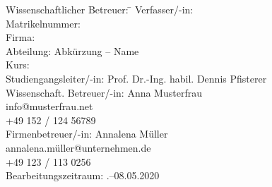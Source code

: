 \begin{titlepage}
\begin{center}
\begin{minipage}{\textwidth}
\begin{tabbing}
	Wissenschaftlicher Betreuer: \hspace{0.85cm}\=\kill
	Verfasser/-in: \> \DerAutorDerArbeit \\[1.5mm]
	Matrikelnummer:  \\[1.5mm]
	Firma: \> \DerNameDerFirma  \\[1.5mm]
	Abteilung: \> Abkürzung -- Name \\[1.5mm]
	Kurs: \> \DieKursbezeichnung \\[1.5mm]
	Studiengangsleiter/-in: \> Prof. Dr.-Ing. habil. Dennis Pfisterer \\[1.5mm]
	Wissenschaft. Betreuer/-in: \> Anna Musterfrau \\
	\> info@musterfrau.net \\
	\> +49 152 / 124 56789 \\[1.5mm]
	Firmenbetreuer/-in: \> Annalena Müller \\
	\> annalena.müller@unternehmen.de \\
	\> +49 123 / 113 0256 \\[1.5mm]
	Bearbeitungszeitraum: .--08.05.2020
\end{tabbing}
\end{minipage}

\end{center}

\end{titlepage}